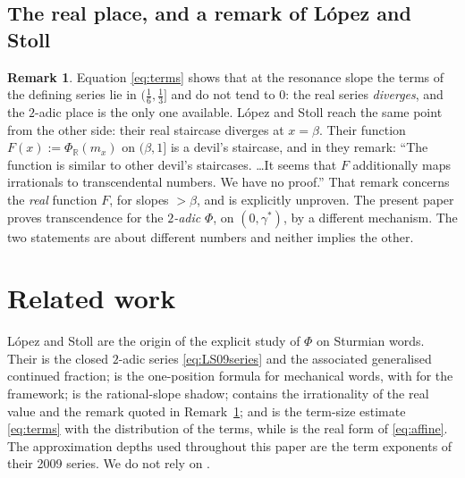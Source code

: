 \documentclass[11pt,reqno]{amsart}
\theoremstyle{plain}
\theoremstyle{definition}
\newtheorem{remark}[theorem]{Remark}
\newcommand{\R}{\mathbb{R}}
\newcommand{\PH}{\Phi}
\newcommand{\gs}{\gamma^{*}}
\begin{document}
\subsection{The real place, and a remark of L\'opez and Stoll}\label{ss:realplace}
\begin{remark}\label{rem:real}
Equation \eqref{eq:terms} shows that at the resonance slope the terms of the defining series lie in
$(\frac16,\frac13]$ and do not tend to $0$: the real series \emph{diverges}, and the $2$-adic place
is the only one available. L\'opez and Stoll reach the same point from the other side: their real
staircase diverges at $x=\beta$. Their function $F(x):=\PH_{\R}(m_x)$ on $(\beta,1]$
\cite[Definition 26]{LS09} is a devil's staircase, and in \cite[\S4]{LS09} they remark: ``The
function is similar to other devil's staircases. \dots It seems that $F$ additionally maps
irrationals to transcendental numbers. We have no proof.'' That remark concerns the \emph{real}
function $F$, for slopes $>\beta$, and is explicitly unproven. The present paper proves
transcendence for the \emph{$2$-adic} $\PH$, on $(0,\gs)$, by a different mechanism. The two
statements are about different numbers and neither implies the other.
\end{remark}

\section{Related work}\label{sec:related}

L\'opez and Stoll are the origin of the explicit study of $\PH$ on Sturmian words. Their
\cite[Theorem 1]{LS09} is the closed $2$-adic series \eqref{eq:LS09series} and
\cite[Corollary 2]{LS09} the associated generalised continued fraction; \cite[Lemma 11]{LS09} is the
one-position formula for mechanical words, with \cite[Ch.~2]{Lothaire02} for the framework;
\cite[Lemma 12]{LS09} is the rational-slope shadow; \cite[\S4]{LS09} contains the irrationality of
the real value and the remark quoted in Remark~\ref{rem:real}; and \cite[Lemma 43, \S11]{LS21} is
the term-size estimate \eqref{eq:terms} with the distribution of the terms, while
\cite[Lemma 37]{LS21} is the real form of \eqref{eq:affine}. The approximation depths used
throughout this paper are the term exponents of their 2009 series. We do not rely on
\cite[Theorem 1]{LS21}.
\end{document}
